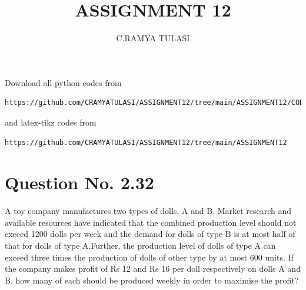 \documentclass[journal,12pt,twocolumn]{IEEEtran}
\begin{document}
\makeatother
\let\StandardTheFigure\thefigure
\let\vec\mathbf
\renewcommand{\thefigure}{\theproblem}
\def\putbox#1#2#3{\makebox[0in][l]{\makebox[#1][l]{}\raisebox{\baselineskip}[0in][0in]{\raisebox{#2}[0in][0in]{#3}}}}
     \def\rightbox#1{\makebox[0in][r]{#1}}
     \def\centbox#1{\makebox[0in]{#1}}
     \def\topbox#1{\raisebox{-\baselineskip}[0in][0in]{#1}}
     \def\midbox#1{\raisebox{-0.5\baselineskip}[0in][0in]{#1}}
\vspace{3cm}
\title{ASSIGNMENT 12}
\author{C.RAMYA TULASI}
\maketitle
\newpage
\bigskip
\renewcommand{\thefigure}{\theenumi}
\renewcommand{\thetable}{\theenumi}
Download all python codes from 
\begin{lstlisting}
https://github.com/CRAMYATULASI/ASSIGNMENT12/tree/main/ASSIGNMENT12/CODES
\end{lstlisting}
%
and latex-tikz codes from 
%
\begin{lstlisting}
https://github.com/CRAMYATULASI/ASSIGNMENT12/tree/main/ASSIGNMENT12
\end{lstlisting}
%
\section{Question No. 2.32}
A toy company manufactures two types of dolls, A and B. Market research and available resources have indicated that the combined production level should not exceed 1200 dolls per week and the demand for dolls of type B
is at most half of that for dolls of type A.Further, the production level of dolls of type A can exceed three times the production of dolls of other type by at most 600 units. If the company makes profit of Rs 12 and Rs 16 per doll respectively on dolls A and B, how many of each should be produced weekly in order to maximise the profit?
%
\end{document}
